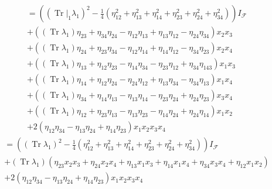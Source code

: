 \documentclass[aps, preprint]{revtex4}
\begin{document}
\begin{align*} &  =\left (\left (\left .\ensuremath{\operatorname*{Tr}}\right \vert _{1} \lambda _{1}\right )^{2} -\frac{1}{4} \left (\eta _{1 2}^{2} +\eta _{1 3}^{2} +\eta _{1 4}^{2} +\eta _{2 3}^{2} +\eta _{2 4}^{2} +\eta _{3 4}^{2}\right )\right ) I_{\mathcal{F}} \\
 &  +\left (\left (\ensuremath{\operatorname*{Tr}} \lambda _{1}\right ) \eta _{2 3} +\eta _{3 4} \eta _{2 4} -\eta _{1 2} \eta _{1 3} +\eta _{1 3} \eta _{1 2} -\eta _{2 4} \eta _{3 4}\right ) x_{2} x_{3} \\
 &  +\left (\left (\ensuremath{\operatorname*{Tr}} \lambda _{1}\right ) \eta _{2 4} +\eta _{2 3} \eta _{3 4} -\eta _{1 2} \eta _{1 4} +\eta _{1 4} \eta _{1 2} -\eta _{3 4} \eta _{2 3}\right ) x_{2} x_{4} \\
 &  +\left (\left (\ensuremath{\operatorname*{Tr}} \lambda _{1}\right ) \eta _{1 3} +\eta _{1 2} \eta _{2 3} -\eta _{1 4} \eta _{3 4} -\eta _{2 3} \eta _{1 2} +\eta _{3 4} \eta _{1 4 3}\right ) x_{1} x_{3} \\
 &  +\left (\left (\ensuremath{\operatorname*{Tr}} \lambda _{1}\right ) \eta _{1 4} +\eta _{1 2} \eta _{2 4} -\eta _{2 4} \eta _{1 2} +\eta _{1 3} \eta _{3 4} -\eta _{3 4} \eta _{1 3}\right ) x_{1} x_{4} \\
 &  +\left (\left (\ensuremath{\operatorname*{Tr}} \lambda _{1}\right ) \eta _{3 4} +\eta _{1 4} \eta _{1 3} -\eta _{1 3} \eta _{1 4} -\eta _{2 3} \eta _{2 4} +\eta _{2 4} \eta _{2 3}\right ) x_{3} x_{4} \\
 &  +\left (\left (\ensuremath{\operatorname*{Tr}} \lambda _{1}\right ) \eta _{1 2} +\eta _{2 3} \eta _{1 3} -\eta _{1 3} \eta _{2 3} -\eta _{1 4} \eta _{2 4} +\eta _{2 4} \eta _{1 4}\right ) x_{1} x_{2} \\
 &  +2 \left (\eta _{1 2} \eta _{3 4} -\eta _{1 3} \eta _{2 4} +\eta _{1 4} \eta _{2 3}\right ) x_{1} x_{2} x_{3} x_{4}\end{align*}
\begin{align*} &  =\left (\left (\ensuremath{\operatorname*{Tr}}\lambda _{1}\right )^{2} -\frac{1}{4} \left (\eta _{1 2}^{2} +\eta _{1 3}^{2} +\eta _{1 4}^{2} +\eta _{2 3}^{2} +\eta _{2 4}^{2} +\eta _{3 4}^{2}\right )\right ) I_{\mathcal{F}} \\
 &  +\left (\ensuremath{\operatorname*{Tr}}\lambda _{1}\right ) \left (\eta _{2 3} x_{2} x_{3} +\eta _{2 4} x_{2} x_{4} +\eta _{1 3} x_{1} x_{3} +\eta _{1 4} x_{1} x_{4} +\eta _{3 4} x_{3} x_{4} +\eta _{1 2} x_{1} x_{2}\right ) \\
 &  +2 \left (\eta _{1 2} \eta _{3 4} -\eta _{1 3} \eta _{2 4} +\eta _{1 4} \eta _{2 3}\right ) x_{1} x_{2} x_{3} x_{4}\end{align*}
\end{document}
